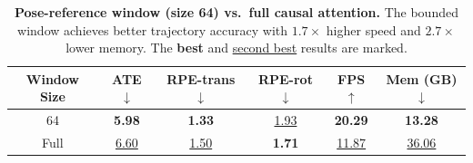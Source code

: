 \begin{table}[t]
\centering
\caption{\textbf{Pose-reference window (size 64) vs.\ full causal attention.} The bounded window achieves better trajectory accuracy with $1.7\times$ higher speed and $2.7\times$ lower memory. The \textbf{best} and \underline{second best} results are marked.}
\label{tab:ablation_sw}
\begin{tabular}{c|ccc | cc}
\toprule
Window Size  &ATE $\downarrow$ & RPE-trans $\downarrow$ & RPE-rot $\downarrow$ & FPS$\uparrow$ & Mem (GB)$\downarrow$\\
\midrule
64        &\textbf{5.98} & \textbf{1.33}  & \underline{1.93}  &  \textbf{20.29} & \textbf{13.28}\\
Full      & \underline{6.60}  & \underline{1.50} & \textbf{1.71} & \underline{11.87} &  \underline{36.06}\\
\bottomrule
\end{tabular}
\end{table}

